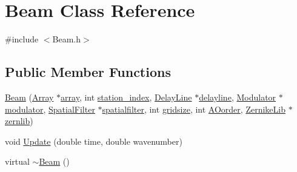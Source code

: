 \hypertarget{classBeam}{
\section{Beam Class Reference}
\label{classBeam}
}


{\ttfamily \#include $<$Beam.h$>$}

\subsection*{Public Member Functions}
\begin{DoxyCompactItemize}
\item 
\hyperlink{classBeam_a29260e5e50b1d45b32747442ccdd56f7}{Beam} (\hyperlink{classArray}{Array} $\ast$\hyperlink{classBeam_abb5a7f1e41ea63a0e693f6e29e11e16c}{array}, int \hyperlink{classBeam_ae589b08d6d0d638c18a15880efc521d2}{station\_\-index}, \hyperlink{classDelayLine}{DelayLine} $\ast$\hyperlink{classBeam_abb779dd249b5a26502a49106aa8023a4}{delayline}, \hyperlink{classModulator}{Modulator} $\ast$\hyperlink{classBeam_a1ef612af4b85d2e5866d40eec618efcb}{modulator}, \hyperlink{classSpatialFilter}{SpatialFilter} $\ast$\hyperlink{classBeam_a68bc1a7abd201297114cd53af925f83f}{spatialfilter}, int \hyperlink{classBeam_a1c813015bb33a0565e1ee3ea0d570e11}{gridsize}, int \hyperlink{classBeam_a2de78a8bf91493e5c0cf0544613d0289}{AOorder}, \hyperlink{classZernikeLib}{ZernikeLib} $\ast$\hyperlink{classBeam_ad41f9e0d00cfe3ed0e5a22a2f3e7c399}{zernlib})
\item 
void \hyperlink{classBeam_a4d94ec1dd570ba7b50614ae39bda51fc}{Update} (double time, double wavenumber)
\item 
virtual \hyperlink{classBeam_ae00ca4866a8f1f721da45ce7c26c6d74}{$\sim$Beam} ()
\end{DoxyCompactItemize}
